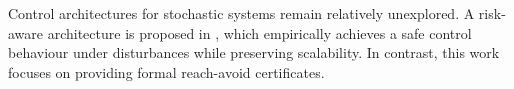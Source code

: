 \documentclass{IEEEtran}
\begin{document}

Control architectures for stochastic systems remain relatively unexplored. A risk-aware architecture is proposed in \cite{akella2024risk}, which empirically achieves a safe control behaviour under disturbances while preserving scalability. In contrast, this work focuses on providing formal reach-avoid certificates.  
\end{document}
